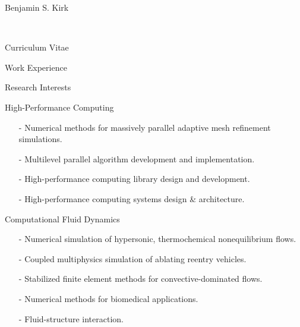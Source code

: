 \documentclass[10pt]{report}
\begin{document}
\begin{cv}{\centerline{\Large Benjamin S. Kirk}\\
    \centerline{\large Curriculum Vitae}}
\begin{cvlist}{Work Experience}
  \end{cvlist}

  \vspace{-.5em}
  \begin{cvlist}{Research Interests}
    \item[High-Performance Computing] \mbox{ }
      \begin{itemize}
        \item[-] Numerical methods for massively parallel adaptive mesh refinement simulations.
        \item[-] Multilevel parallel algorithm development and implementation.
        \item[-] High-performance computing library design and development.
        \item[-] High-performance computing systems design \& architecture.
      \end{itemize}
    \item[Computational Fluid Dynamics] \mbox{ }
      \begin{itemize}
        \item[-] Numerical simulation of hypersonic, thermochemical nonequilibrium flows.
        \item[-] Coupled multiphysics simulation of ablating reentry vehicles.
        \item[-] Stabilized finite element methods for convective-dominated flows.
        \item[-] Numerical methods for biomedical applications.
        \item[-] Fluid-structure interaction.
      \end{itemize}
  \end{cvlist}


\end{cv}
\end{document}
